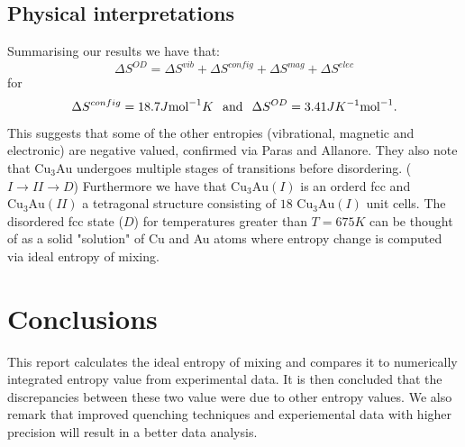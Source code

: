 \documentclass{article}
\begin{document}
\newpage

\subsection{Physical interpretations}
Summarising our results we have that:
$$\Delta S^{OD}=\Delta S^{vib}+\Delta S^{config}
+\Delta S^{mag}+\Delta S^{elec}$$
for
$$\Delta S^{config}=18.7J\text{mol}^{-1}K
\hspace{0.1in}\text{and}\hspace{0.1in}
\Delta S^{OD}=3.41JK^{-1}\text{mol}^{-1}.$$
This suggests that some of the other entropies (vibrational,
magnetic and electronic) are negative valued,
confirmed via Paras and Allanore.\cite{paras}
They also note that
$\text{Cu}_3\text{Au}$ undergoes multiple stages of transitions
before disordering. ($I\rightarrow II\rightarrow D$)
Furthermore we have that $\text{Cu}_3\text{Au}(I)$ is an
orderd fcc and $\text{Cu}_3\text{Au}(II)$ a
tetragonal structure consisting of $18$ $\text{Cu}_3\text{Au}(I)$
unit cells.\cite{okamoto}
The disordered fcc state ($D$) for temperatures greater
than $T=675K$ can be thought of as a solid
"solution" of Cu and Au atoms where entropy change is computed
via ideal entropy of mixing.

\section{Conclusions}
This report calculates the ideal entropy of mixing and
compares it to numerically integrated entropy value
from experimental data. It is then concluded that
the discrepancies between these two value were due
to other entropy values.
We also remark that improved quenching techniques
and experiemental data with higher precision will result in
a better data analysis.

\printbibliography[title={References}]
\end{document}

